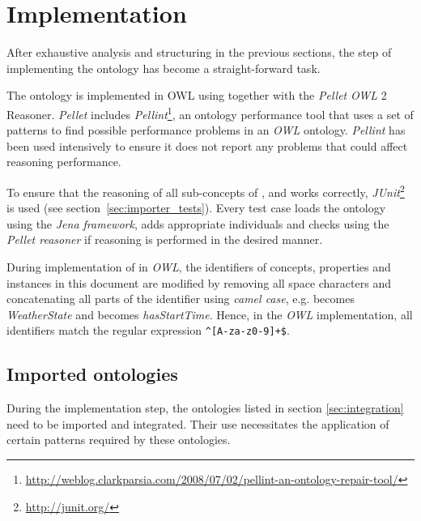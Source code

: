 \section{Implementation}
\label{sec:implementation}

After exhaustive analysis and structuring in the previous sections, the step of implementing the ontology has become a straight-forward task.

The \thinkhomeweather ontology is implemented in OWL using  together with the \emph{Pellet} \emph{OWL} 2 Reasoner. \emph{Pellet} includes \emph{Pellint}\footnote{\href{http://weblog.clarkparsia.com/2008/07/02/pellint-an-ontology-repair-tool/}{http://weblog.clarkparsia.com/2008/07/02/pellint-an-ontology-repair-tool/}}, an ontology performance tool that uses a set of patterns to find possible performance problems in an \emph{OWL} ontology. \emph{Pellint} has been used intensively to ensure it does not report any problems that could affect reasoning performance.

To ensure that the reasoning of all sub-concepts of ,  and  works correctly, \emph{JUnit}\footnote{\href{http://junit.org/}{http://junit.org/}} is used (see section~\ref{sec:importer_tests}). Every test case loads the \thinkhomeweather ontology using the \emph{Jena framework}, adds appropriate individuals and checks using the \emph{Pellet reasoner} if reasoning is performed in the desired manner.

During implementation of \thinkhomeweather in \emph{OWL}, the identifiers of concepts, properties and instances in this document are modified by removing all space characters and concatenating all parts of the identifier using \emph{camel case}\cite{CamelCase}, e.g.  becomes \emph{WeatherState} and  becomes \emph{hasStartTime}. Hence, in the \emph{OWL} implementation, all identifiers match the regular expression \texttt{\textasciicircum[A-za-z0-9]+\$}.


\subsection{Imported ontologies}

During the implementation step, the ontologies listed in section \ref{sec:integration} need to be imported and integrated. Their use necessitates the application of certain patterns required by these ontologies.

\vspace{1em}

